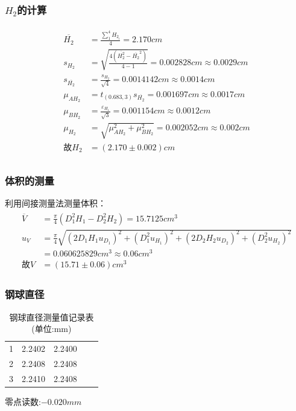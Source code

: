 \documentclass[12pt,a4paper,UTF8]{ctexart}
\begin{document}
\subsubsection*{$H_2$的计算}
\begin{align*}
	\begin{aligned}
	\overline{H_2}&=\frac{\sum_{1}^{4}H_{2_i}}{4}=2.170cm\\
	s_{H_{2}}&=\sqrt{\frac{4(\overline{H_2^2}-\overline{H_2}^2)}{4-1}}=0.002828cm\approx 0.0029cm\\
	s_{\overline{H_2}} &= \frac{s_{H_{2}}}{\sqrt{4}} = 0.0014142cm\approx 0.0014cm\\
	\mu_{AH_2} &= t_{(0.683,3)}s_{\overline{H_2}} = 0.001697cm\approx0.0017cm\\
	\mu_{BH_2} &= \frac{\varepsilon_{H_1}}{\sqrt{3}} = 0.001154cm\approx 0.0012cm\\
	\mu_{H_2} &= \sqrt{\mu_{AH_2}^2+\mu_{BH_2}^2}=0.002052cm\approx 0.002cm\\
	\text{故}H_2 &= (2.170 \pm 0.002)cm \\
	\end{aligned}
\end{align*}
\subsubsection*{体积的测量}
利用间接测量法测量体积：
\begin{align*}
	\begin{aligned}
		\overline{V}&=\frac{\pi}{4}(D_{1}^{2}H_{1}-D_{2}^{2}H_{2}) = 15.7125cm^3\\
		u_{V}&=\frac{\pi}{4}\sqrt{(2D_{1}H_{1}u_{D_{1}})^{2}+(D_{1}^{2}u_{H_{1}})^{2}+(2D_{2}H_{2}u_{D_{2}})^{2}+(D_{2}^{2}u_{H_{2}})^{2}}\\
		&=0.060625829cm^3\approx 0.06cm^3\\
		\text{故}V &= (15.71 \pm 0.06)cm^3
	\end{aligned}
\end{align*}
\subsubsection*{钢球直径}
\begin{table}[!htbp]
	\centering
	\caption{钢球直径测量值记录表(单位:mm)}
	\begin{tabular}{ccccc}
		\toprule
		\makebox[0.1\textwidth][c]{方向}&\makebox[0.1\textwidth][c]{$D_{1_i}$}&\makebox[0.1\textwidth][c]{$D_{2_i}$}\\
		\midrule
		1 & 2.2402 & 2.2400 	\\
		2 & 2.2408 & 2.2408	\\
		3 & 2.2410 & 2.2408 	\\
		\bottomrule
	\end{tabular}
\end{table}
\vspace*{-0.75cm}
\begin{center}
	零点读数:$-0.020mm$
\end{center}
\end{document}

